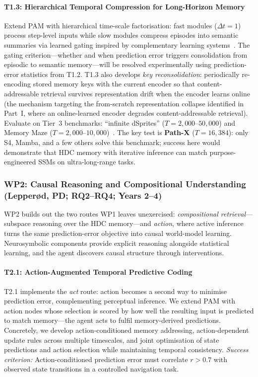 \paragraph{T1.3: Hierarchical Temporal Compression for Long-Horizon Memory}
Extend PAM with hierarchical time-scale factorisation: fast modules ($\Delta t{=}1$) process step-level inputs while slow modules compress episodes into semantic summaries via learned gating inspired by complementary learning systems~\cite{ramapuram2021kanerva}. The gating criterion---whether and when prediction error triggers consolidation from episodic to semantic memory---will be resolved experimentally using prediction-error statistics from T1.2. T1.3 also develops \textit{key reconsolidation}: periodically re-encoding stored memory keys with the current encoder so that content-addressable retrieval survives representation drift when the encoder learns online (the mechanism targeting the from-scratch representation collapse identified in Part~I, where an online-learned encoder degrades content-addressable retrieval). Evaluate on Tier~3 benchmarks: ``infinite dSprites'' ($T{=}2{,}000$--$50{,}000$) and Memory Maze ($T{=}2{,}000$--$10{,}000$)~\cite{pasukonis2022evaluating}. The key test is \textbf{Path-X} ($T{=}16{,}384$): only S4, Mamba, and a few others solve this benchmark; success here would demonstrate that HDC memory with iterative inference can match purpose-engineered SSMs on ultra-long-range tasks.

\subsubsection*{WP2: Causal Reasoning and Compositional Understanding \textnormal{(Lepperød, PD; RQ2--RQ4; Years 2--4)}}

WP2 builds out the two routes WP1 leaves unexercised: \textit{compositional retrieval}---subspace reasoning over the HDC memory---and \textit{action}, where active inference turns the same prediction-error objective into causal world-model learning. Neurosymbolic components provide explicit reasoning alongside statistical learning, and the agent discovers causal structure through interventions.

\paragraph{T2.1: Action-Augmented Temporal Predictive Coding}
T2.1 implements the \textit{act} route: action becomes a second way to minimise prediction error, complementing perceptual inference. We extend PAM with action nodes whose selection is scored by how well the resulting input is predicted to match memory---the agent acts to fulfil memory-derived predictions. Concretely, we develop action-conditioned memory addressing, action-dependent update rules across multiple timescales, and joint optimisation of state predictions and action selection while maintaining temporal consistency.
\textit{Success criterion:} Action-conditioned prediction error must correlate $r{>}0.7$ with observed state transitions in a controlled navigation task.

